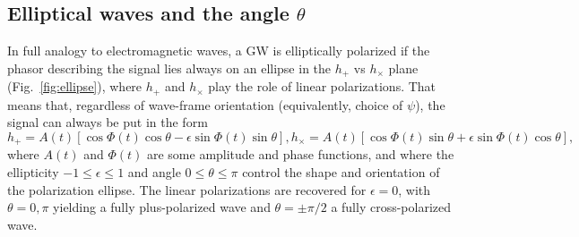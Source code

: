 \documentclass[aps,prd,twocolumn,superscriptaddress,preprintnumbers,floatfix,nofootinbib]{revtex4-2}
\begin{document}
\subsection{Elliptical waves and the angle $\theta$}
\label{sec:ellip}

In full analogy to electromagnetic waves, a GW is elliptically polarized if the phasor describing the signal lies always on an ellipse in the $h_+$ vs $h_\times$ plane (Fig.~\ref{fig:ellipse}), where $h_+$ and $h_\times$ play the role of linear polarizations.
That means that, regardless of wave-frame orientation (equivalently, choice of $\psi$), the signal can always be put in the form
\begin{subequations} \label{eq:ellip}
\begin{equation} \label{eq:ellip_p}
h_+ = A(t) \left[\cos \Phi(t) \cos \theta - \epsilon \sin \Phi(t) \sin\theta \right] ,
\end{equation}
\begin{equation} \label{eq:ellip_c}
h_\times = A(t) \left[ \cos \Phi(t) \sin \theta + \epsilon \sin \Phi(t) \cos\theta \right] ,
\end{equation}
\end{subequations}
where $A(t)$ and $\Phi(t)$ are some amplitude and phase functions, and where the ellipticity $-1 \leq \epsilon \leq 1$ and angle $0 \leq \theta \leq \pi$ control the shape and orientation of the polarization ellipse.
The linear polarizations are recovered for $\epsilon = 0$, with $\theta=0, \pi$ yielding a fully plus-polarized wave and $\theta=\pm \pi/2$ a fully cross-polarized wave.

\end{document}
